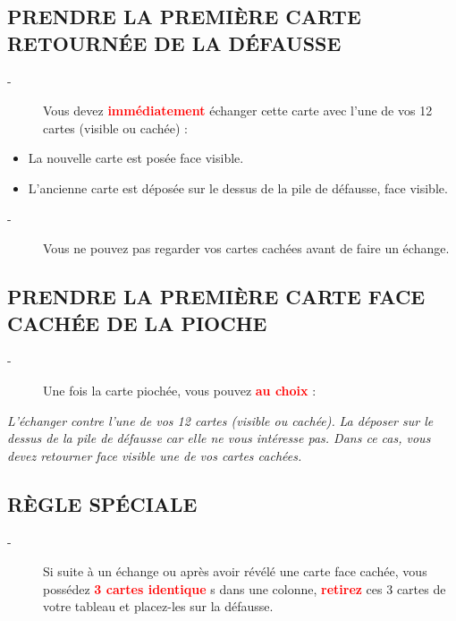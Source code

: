 \documentclass{article}%
\begin{document}
%
\subsection{ PRENDRE LA PREMIÈRE CARTE RETOURNÉE DE LA DÉFAUSSE
}%
\label{subsec:PRENDRELAPREMIRECARTERETOURNEDELADFAUSSE}%
\begin{description}%
\item[{-} ]%
%
 Vous devez %
\textcolor{red}{%
\textbf{immédiatement}%
}%
\textit{ }%
 échanger cette carte avec l’une de vos 12 cartes (visible ou cachée) :
%
\end{description}%
\begin{itemize}%
\item%
%
 La nouvelle carte est posée face visible.
%
\item%
%
 L'ancienne carte est déposée sur le dessus de la pile de défausse, face visible.
%
\end{itemize}%
\begin{description}%
\item[{-} ]%
%
 Vous ne pouvez pas regarder vos cartes cachées avant de faire un échange.
%
\end{description}

%
\subsection{ PRENDRE LA PREMIÈRE CARTE FACE CACHÉE DE LA PIOCHE
}%
\label{subsec:PRENDRELAPREMIRECARTEFACECACHEDELAPIOCHE}%
\begin{description}%
\item[{-} ]%
%
Une fois la carte piochée, vous pouvez %
\textcolor{red}{%
\textbf{au choix}%
}%
\textit{ }%
 :
%
\end{description}%
\textit{ }%
\textit{L'échanger}%
\textit{ contre l'une de vos 12 cartes (visible ou cachée).
}%
\textit{ La déposer sur le dessus de la pile de }%
\textit{défausse}%
\textit{ car elle ne vous intéresse pas. Dans ce cas, vous devez retourner face visible une de vos cartes cachées.
}

%
\subsection{ RÈGLE SPÉCIALE
}%
\label{subsec:RGLESPCIALE}%
\begin{description}%
\item[{-} ]%
%
 Si suite à un échange ou après avoir révélé une carte face cachée, vous possédez %
\textcolor{red}{%
\textbf{3 cartes identique}%
}%
s dans une colonne, %
\textcolor{red}{%
\textbf{retirez}%
}%
\textit{ }%
 ces 3 cartes de votre tableau et placez{-}les sur la défausse.
%
\end{description}
\end{document}
